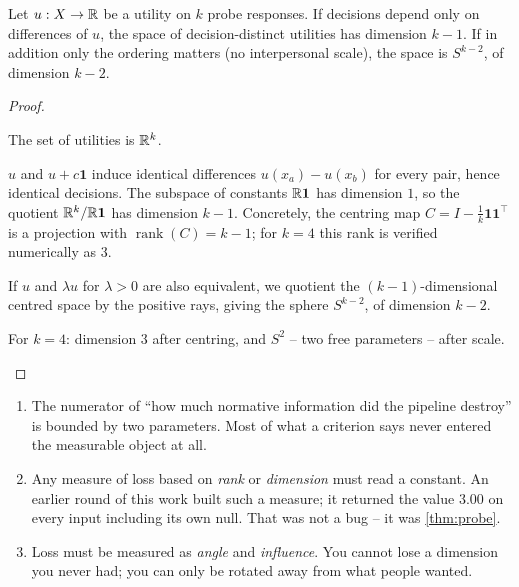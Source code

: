 \begin{theorem}
\label{thm:probe}
Let $u : X \to \mathbb{R}$ be a utility on $k$ probe responses. If decisions depend only
on differences of $u$, the space of decision-distinct utilities has dimension
$k-1$. If in addition only the ordering matters (no interpersonal scale), the
space is $S^{k-2}$, of dimension $k-2$.
\end{theorem}
\begin{proof}
\begin{steps}
\item The set of utilities is $\mathbb{R}^k$.
\item $u$ and $u + c\mathbf{1}$ induce identical
differences $u(x_a)-u(x_b)$ for every pair, hence identical decisions. The
subspace of constants $\mathbb{R}\mathbf{1}$ has dimension $1$, so the quotient
$\mathbb{R}^k/\mathbb{R}\mathbf{1}$ has dimension $k-1$. Concretely, the centring map
$C = I - \tfrac1k\mathbf{1}\mathbf{1}^\top$ is a projection with
$\operatorname{rank}(C) = k-1$; for $k=4$ this rank is verified numerically as
$3$.
\item If $u$ and $\lambda u$ for $\lambda>0$ are
also equivalent, we quotient the $(k-1)$-dimensional centred space by the
positive rays, giving the sphere $S^{k-2}$, of dimension $k-2$.
\item For $k=4$: dimension $3$ after centring, and $S^2$ -- two free
parameters -- after scale.
\end{steps}
\end{proof}


\begin{corollary}
\label{cor:probe3}
\begin{enumerate}
\item The numerator of ``how much normative information did the pipeline
      destroy'' is bounded by two parameters. Most of what a criterion says never
      entered the measurable object at all.
\item Any measure of loss based on \emph{rank} or \emph{dimension} must read a
      constant. An earlier round of this work built such a measure; it returned
      the value $3.00$ on every input including its own null. That was not a bug
      -- it was \cref{thm:probe}.
\item Loss must be measured as \emph{angle} and \emph{influence}. You cannot lose
      a dimension you never had; you can only be rotated away from what people
      wanted.
\end{enumerate}
\end{corollary}


